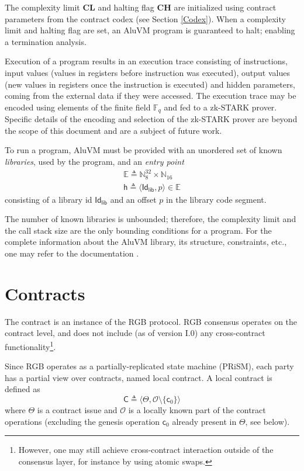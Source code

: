 \documentclass[9pt,oneside]{amsart}
\begin{document}
\begin{multicols}{2}
The complexity limit \textbf{CL} and halting flag \textbf{CH}
are initialized using contract parameters from the contract codex (see Section \ref{Codex}).
When a complexity limit and halting flag are set, an AluVM program is guaranteed to halt;
enabling a termination analysis.

Execution of a program results in an execution trace consisting of instructions,
input values (values in registers before instruction was executed),
output values (new values in registers once the instruction is executed)
and hidden parameters, coming from the external data if they were accessed.
The execution trace may be encoded using elements of the finite field $\mathbb{F}_q$
and fed to a zk-STARK prover.
Specific details of the encoding and selection of the zk-STARK prover
are beyond the scope of this document and are a subject of future work.

To run a program, AluVM must be provided with an unordered set of known \emph{libraries},
used by the program, and an \emph{entry point}
\noindent
\begin{gather}\label{eq:e}
\mathbb{E} \triangleq \mathbb{N}^{32}_8 \times \mathbb{N}_{16} \\
\mathsf{h} \triangleq \langle \mathsf{Id_{lib}}, p \rangle \in \mathbb{E}
\end{gather}
\noindent
consisting of a library id $\mathsf{Id_{lib}}$ and an offset $p$ in the library code segment.

The number of known libraries is unbounded; therefore, the complexity limit and the call stack size
are the only bounding conditions for a program.
For the complete information about the AluVM library, its structure, constraints, etc.,
one may refer to the documentation \cite{AluVM}.

\section{Contracts}\label{Contracts}

The contract is an instance of the RGB protocol. RGB consensus operates on the contract level,
and does not include (as of version I.0) any cross-contract functionality\footnote{%
    However, one may still achieve cross-contract interaction outside of the consensus layer,
    for instance by using atomic swaps.}.

Since RGB operates as a partially-replicated state machine (PRiSM),
each party has a partial view over contracts, named \gls{local contract}.
A local contract is defined as
\noindent
\begin{equation}
\mathsf{C} \triangleq \langle \mathsf{\Theta}, \mathcal{O} \setminus \{ \mathsf{c}_0 \} \rangle
\end{equation}
\noindent
where $\Theta$ is a contract issue and
$\mathcal{O}$ is a locally known part of the contract operations
(excluding the genesis operation $\mathsf{c}_0$ already present in $\Theta$, see below).


\end{multicols}
\end{document}
